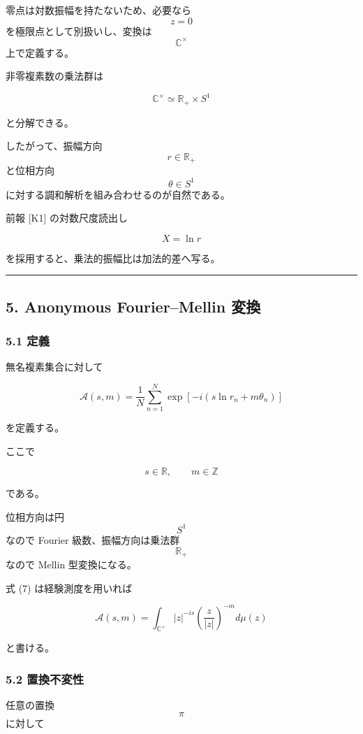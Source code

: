 \documentclass[
  a4paper,
]{ltjsarticle}
\begin{document}
零点は対数振幅を持たないため、必要なら \[z=0\]
を極限点として別扱いし、変換は \[\mathbb C^\times\] 上で定義する。

非零複素数の乗法群は

\[
\mathbb C^\times
\simeq
\mathbb R_+
\times
S^1
\]

と分解できる。

したがって、振幅方向 \[r\in\mathbb R_+\] と位相方向 \[\theta\in S^1\]
に対する調和解析を組み合わせるのが自然である。

前報 {[}K1{]} の対数尺度読出し

\[
X=\ln r
\]

を採用すると、乗法的振幅比は加法的差へ写る。

\begin{center}\rule{0.5\linewidth}{0.5pt}\end{center}

\subsection{5. Anonymous Fourier--Mellin
変換}\label{anonymous-fouriermellin-ux5909ux63db}

\subsubsection{5.1 定義}\label{ux5b9aux7fa9}

無名複素集合に対して

\[
\boxed{
\mathcal A(s,m)
=
\frac1N
\sum_{n=1}^{N}
\exp
\left[
-i
\left(
s\ln r_n
+
m\theta_n
\right)
\right]
}
\tag{7}
\]

を定義する。

ここで

\[
s\in\mathbb R,
\qquad
m\in\mathbb Z
\]

である。

位相方向は円 \[S^1\] なので Fourier 級数、振幅方向は乗法群
\[\mathbb R_+\] なので Mellin 型変換になる。

式 (7) は経験測度を用いれば

\[
\mathcal A(s,m)
=
\int_{\mathbb C^\times}
|z|^{-is}
\left(
\frac{z}{|z|}
\right)^{-m}
d\mu(z)
\tag{8}
\]

と書ける。

\subsubsection{5.2 置換不変性}\label{ux7f6eux63dbux4e0dux5909ux6027}

任意の置換 \[\pi\] に対して
\end{document}

